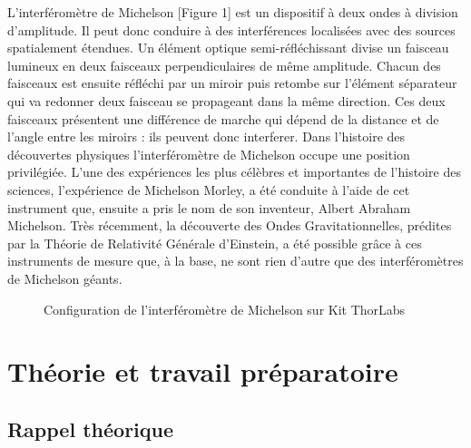 \documentclass[11pt, openright]{book}
\begin{document}
			L'interféromètre de Michelson [Figure 1] est un dispositif à deux ondes à division d'amplitude. Il peut donc conduire à des interférences localisées avec des sources spatialement étendues. Un élément optique semi-réfléchissant divise un faisceau lumineux en deux faisceaux perpendiculaires de même amplitude. Chacun des faisceaux est ensuite réfléchi par un miroir puis retombe sur l'élément séparateur qui va redonner deux faisceau se propageant dans la même direction. Ces deux faisceaux présentent une différence de marche qui dépend de la distance et de l'angle entre les miroirs : ils peuvent donc interferer. Dans l'histoire des découvertes physiques l'interféromètre de Michelson occupe une position privilégiée. L'une des expériences les plus célèbres et importantes de l'histoire des sciences, l'expérience de Michelson Morley, a été conduite à l'aide de cet instrument que, ensuite a pris le nom de son inventeur, Albert Abraham Michelson. Très récemment, la découverte des Ondes Gravitationnelles, prédites par la Théorie de Relativité Générale d'Einstein, a été possible grâce à ces instruments de mesure que, à la base, ne sont rien d'autre que des interféromètres de Michelson géants.

			\begin{figure}[ht!]
				\centering
				\caption{Configuration de l'interféromètre de Michelson sur Kit ThorLabs}
			\end{figure}

		\section{Théorie et travail préparatoire}

			\subsection{Rappel théorique}
\end{document}
